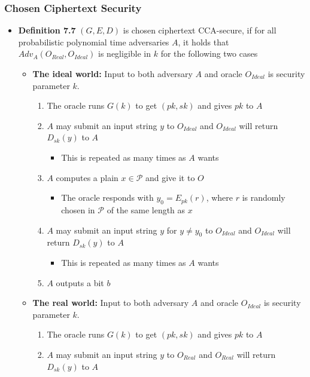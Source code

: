 \subsubsection{Chosen Ciphertext Security}
\begin{itemize}
  \item \textbf{Definition 7.7} $(G,E,D)$ is chosen ciphertext CCA-secure, if for all probabilistic polynomial time adversaries $A$, it holds that $Adv_A(O_{Real},O_{Ideal})$ is negligible in $k$ for the following two cases
  \begin{itemize}
  	\item \textbf{The ideal world:} Input to both adversary $A$ and oracle $O_{Ideal}$ is security parameter $k$.
    \begin{enumerate}
  		\item The oracle runs $G(k)$ to get $(pk,sk)$ and gives $pk$ to $A$
  		\item $A$ may submit an input string $y$ to $O_{Ideal}$ and $O_{Ideal}$ will return $D_{sk}(y)$ to $A$
      \begin{itemize}
  			\item This is repeated as many times as $A$ wants
      \end{itemize}
  		\item $A$ computes a plain $x \in \mathcal P$ and give it to $O$
      \begin{itemize}
  			\item The oracle responds with $y_0 = E_{pk}(r)$, where $r$ is randomly chosen in $\mathcal P$ of the same length as $x$
      \end{itemize}
  		\item $A$ may submit an input string $y$ for $y \neq y_0$ to $O_{Ideal}$ and $O_{Ideal}$ will return $D_{sk}(y)$ to $A$
      \begin{itemize}
  			\item This is repeated as many times as $A$ wants
      \end{itemize}
  		\item $A$ outputs a bit $b$
    \end{enumerate}
  	\item \textbf{The real world:} Input to both adversary $A$ and oracle $O_{Ideal}$ is security parameter $k$.
    \begin{enumerate}
  		\item The oracle runs $G(k)$ to get $(pk,sk)$ and gives $pk$ to $A$
  		\item $A$ may submit an input string $y$ to $O_{Real}$ and $O_{Real}$ will return $D_{sk}(y)$ to $A$

\end{enumerate}
\end{itemize}
\end{itemize}

